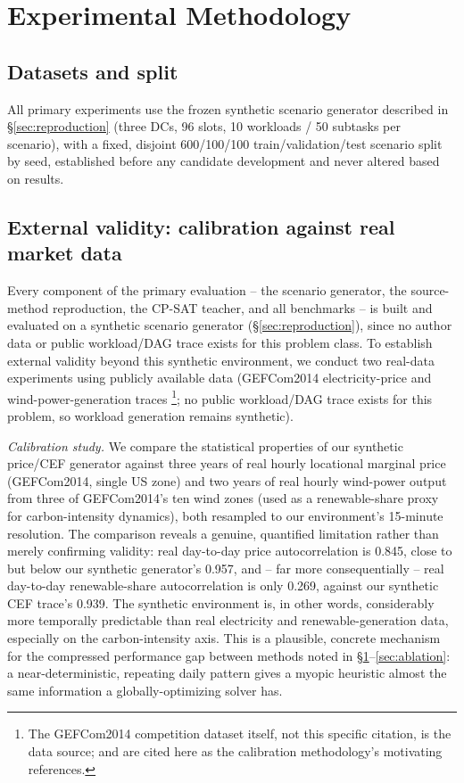 \documentclass[journal]{IEEEtran}
\begin{document}
\section{Experimental Methodology}
\label{sec:experiments}

\subsection{Datasets and split}
All primary experiments use the frozen synthetic scenario generator described in \S\ref{sec:reproduction} (three DCs, 96 slots, 10 workloads / 50 subtasks per scenario), with a fixed, disjoint 600/100/100 train/validation/test scenario split by seed, established before any candidate development and never altered based on results.

\subsection{External validity: calibration against real market data}
\label{sec:realdata}
Every component of the primary evaluation -- the scenario generator, the source-method reproduction, the CP-SAT teacher, and all benchmarks -- is built and evaluated on a synthetic scenario generator (\S\ref{sec:reproduction}), since no author data or public workload/DAG trace exists for this problem class. To establish external validity beyond this synthetic environment, we conduct two real-data experiments using publicly available data (GEFCom2014 electricity-price and wind-power-generation traces \cite{radovanovic2023}\footnote{The GEFCom2014 competition dataset itself, not this specific citation, is the data source; \cite{radovanovic2023} and \cite{wiesner2021} are cited here as the calibration methodology's motivating references.}; no public workload/DAG trace exists for this problem, so workload generation remains synthetic).

\textit{Calibration study.} We compare the statistical properties of our synthetic price/CEF generator against three years of real hourly locational marginal price (GEFCom2014, single US zone) and two years of real hourly wind-power output from three of GEFCom2014's ten wind zones (used as a renewable-share proxy for carbon-intensity dynamics), both resampled to our environment's 15-minute resolution. The comparison reveals a genuine, quantified limitation rather than merely confirming validity: real day-to-day price autocorrelation is 0.845, close to but below our synthetic generator's 0.957, and -- far more consequentially -- real day-to-day renewable-share autocorrelation is only 0.269, against our synthetic CEF trace's 0.939. The synthetic environment is, in other words, considerably more temporally predictable than real electricity and renewable-generation data, especially on the carbon-intensity axis. This is a plausible, concrete mechanism for the compressed performance gap between methods noted in \S\ref{sec:experiments}--\ref{sec:ablation}: a near-deterministic, repeating daily pattern gives a myopic heuristic almost the same information a globally-optimizing solver has.
\end{document}
